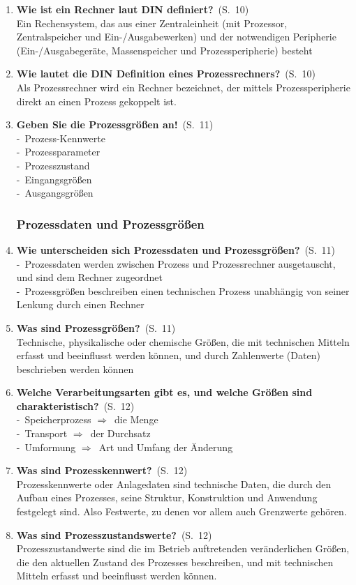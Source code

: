 \documentclass[a4paper,12pt]{article}
\newcommand{\question}[3]{\pagebreak[3]\item {\textbf{#1?}}\ (S.\ #2)#3}
\newcommand{\statement}[3]{\pagebreak[3]\item {\textbf{#1!}}\ (S.\ #2)#3}
\newcommand{\catchword}[1]{\\-\ #1}
\newcommand{\normaltext}[1]{\\#1}
\newcommand{\resultol}[1]{$\Rightarrow$\ #1}
\newcommand{\page}[1]{#1}
\begin{document}
\begin{enumerate}
  \question{Wie ist ein Rechner laut DIN definiert}{\page{10}}
  {
    \normaltext{Ein Rechensystem, das aus einer Zentraleinheit (mit Prozessor, Zentralspeicher
                und Ein-/Ausgabewerken) und der notwendigen Peripherie (Ein-/Ausgabegeräte,
                Massenspeicher und Prozessperipherie) besteht}
  }

  \question{Wie lautet die DIN Definition eines Prozessrechners}{\page{10}}
  {
    \normaltext{Als Prozessrechner wird ein Rechner bezeichnet, der mittels Prozessperipherie direkt
                an einen Prozess gekoppelt ist.}
  }

  \statement{Geben Sie die Prozessgrößen an}{\page{11}}
  {
    \catchword{Prozess-Kennwerte}
    \catchword{Prozessparameter}
    \catchword{Prozesszustand}
    \catchword{Eingangsgrößen}
    \catchword{Ausgangsgrößen}
  }

  \subsubsection{Prozessdaten und Prozessgrößen}

  \question{Wie unterscheiden sich Prozessdaten und Prozessgrößen}{\page{11}}
  {
    \catchword{Prozessdaten werden zwischen Prozess und Prozessrechner ausgetauscht, und sind
               dem Rechner zugeordnet}
    \catchword{Prozessgrößen beschreiben einen technischen Prozess unabhängig von seiner Lenkung
               durch einen Rechner}
  }

  \question{Was sind Prozessgrößen}{\page{11}}
  {
    \normaltext{Technische, physikalische oder chemische Größen, die mit technischen Mitteln
                erfasst und beeinflusst werden können, und durch Zahlenwerte (Daten) beschrieben
                werden können}
  }

  \question{Welche Verarbeitungsarten gibt es, und welche Größen sind charakteristisch}{\page{12}}
  {
    \catchword{Speicherprozess \resultol{die Menge}}
    \catchword{Transport \resultol{der Durchsatz}}
    \catchword{Umformung \resultol{Art und Umfang der Änderung}}
  }

  \question{Was sind Prozesskennwert}{\page{12}}
  {
    \normaltext{Prozesskennwerte oder Anlagedaten sind technische Daten, die durch den Aufbau eines
                Prozesses, seine Struktur, Konstruktion und Anwendung festgelegt sind. Also Festwerte,
                zu denen vor allem auch Grenzwerte gehören.}
  }

  \question{Was sind Prozesszustandswerte}{\page{12}}
  {
    \normaltext{Prozesszustandwerte sind die im Betrieb auftretenden veränderlichen Größen, die den
                aktuellen Zustand des Prozesses beschreiben, und mit technischen Mitteln erfasst
                und beeinflusst werden können.}
  }


\end{enumerate}
\end{document}
